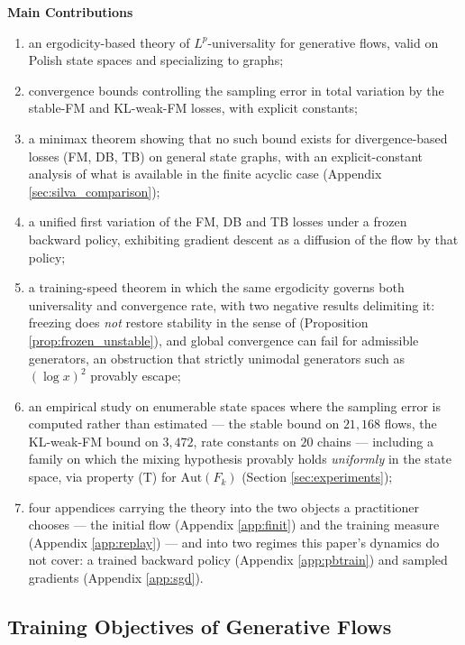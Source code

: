 \textbf{Main Contributions}
\begin{enumerate}
    \item an ergodicity-based theory of $L^p$-universality for generative flows, valid on
    Polish state spaces and specializing to graphs;
    \item convergence bounds controlling the sampling error in total variation by the
    stable-FM and KL-weak-FM losses, with explicit constants;
    \item a minimax theorem showing that no such bound exists for divergence-based losses (FM,
    DB, TB) on general state graphs, with an explicit-constant analysis of what is available in
    the finite acyclic case (Appendix \ref{sec:silva_comparison});
    \item a unified first variation of the FM, DB and TB losses under a frozen backward
    policy, exhibiting gradient descent as a diffusion of the flow by that policy;
    \item a training-speed theorem in which the same ergodicity governs both universality and
    convergence rate, with two negative results delimiting it: freezing does \emph{not} restore
    stability in the sense of \citet{brunswic2024theory} (Proposition
    \ref{prop:frozen_unstable}), and global convergence can fail for admissible generators, an
    obstruction that strictly unimodal generators such as $(\log x)^2$ provably escape;
    \item an empirical study on enumerable state spaces where the sampling error is computed
    rather than estimated --- the stable bound on $21{,}168$ flows, the KL-weak-FM bound on
    $3{,}472$, rate constants on $20$ chains --- including a family on which the mixing
    hypothesis provably holds \emph{uniformly} in the state space, via property (T) for
    $\mathrm{Aut}(F_k)$ (Section \ref{sec:experiments});
    \item four appendices carrying the theory into the two objects a practitioner chooses ---
    the initial flow (Appendix \ref{app:finit}) and the training measure (Appendix
    \ref{app:replay}) --- and into two regimes this paper's dynamics do not cover: a trained
    backward policy (Appendix \ref{app:pbtrain}) and sampled gradients (Appendix
    \ref{app:sgd}).
\end{enumerate}
\subsection{Training Objectives of Generative Flows}
    
